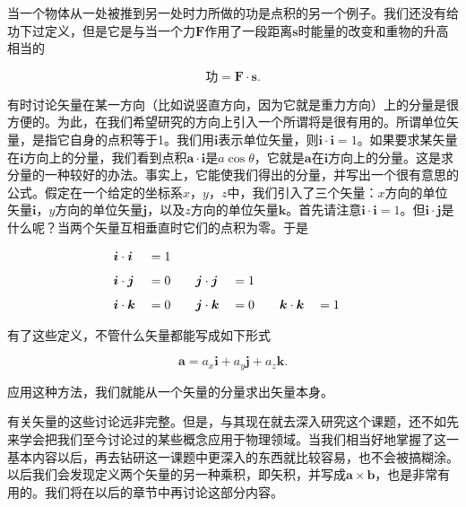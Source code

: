 \documentclass[12pt,oneside]{book}
\providecommand{\FLPvec}[1]{\boldsymbol{#1}}
\providecommand{\FLPF}[0]{\FLPvec{F}}
\providecommand{\FLPa}[0]{\FLPvec{a}}
\providecommand{\FLPb}[0]{\FLPvec{b}}
\providecommand{\FLPi}[0]{\FLPvec{i}}
\providecommand{\FLPj}[0]{\FLPvec{j}}
\providecommand{\FLPk}[0]{\FLPvec{k}}
\providecommand{\FLPs}[0]{\FLPvec{s}}
\begin{document}
当一个物体从一处被推到另一处时力所做的功是点积的另一个例子。我们还没有给功下过定义，但是它是与当一个力$ \FLPF $作用了一段距离$ \FLPs $时能量的改变和重物的升高相当的

\begin{equation}
\label{Eq:I:11:23}
\text{功}=\FLPF\cdot\FLPs.
\end{equation}


有时讨论矢量在某一方向（比如说竖直方向，因为它就是重力方向）上的分量是很方便的。为此，在我们希望研究的方向上引入一个所谓将是很有用的。所谓单位矢量，是指它自身的点积等于1。我们用$ \FLPi $表示单位矢量，则$ \FLPi\cdot\FLPi = 1 $。如果要求某矢量在$ \FLPi $方向上的分量，我们看到点积$ \FLPa\cdot\FLPi $是$ a\cos\theta $，它就是$ \FLPa $在$ \FLPi $方向上的分量。这是求分量的一种较好的办法。事实上，它能使我们得出的分量，并写出一个很有意思的公式。假定在一个给定的坐标系$ x $，$ y $，$ z $中，我们引入了三个矢量：$ x $方向的单位矢量$ \FLPi $，$ y $方向的单位矢量$ \FLPj $，以及$ z $方向的单位矢量$ \FLPk $。首先请注意$ \FLPi\cdot\FLPi = 1 $。但$ \FLPi\cdot\FLPj $是什么呢？当两个矢量互相垂直时它们的点积为零。于是

\begin{alignat}{6}
&\FLPi\cdot\FLPi&&=1\notag\\[1ex]
&\FLPi\cdot\FLPj&&=0&\quad
&\FLPj\cdot\FLPj&&=1\notag\\[1ex]
\label{Eq:I:11:24}
&\FLPi\cdot\FLPk&&=0&\quad
&\FLPj\cdot\FLPk&&=0&\quad
&\FLPk\cdot\FLPk&&=1
\end{alignat}

有了这些定义，不管什么矢量都能写成如下形式

\begin{equation}
\label{Eq:I:11:25}
\FLPa=a_x\FLPi+a_y\FLPj+a_z\FLPk.
\end{equation}

应用这种方法，我们就能从一个矢量的分量求出矢量本身。

有关矢量的这些讨论远非完整。但是，与其现在就去深入研究这个课题，还不如先来学会把我们至今讨论过的某些概念应用于物理领域。当我们相当好地掌握了这一基本内容以后，再去钻研这一课题中更深入的东西就比较容易，也不会被搞糊涂。以后我们会发现定义两个矢量的另一种乘积，即矢积，并写成$ \FLPa\times\FLPb $，也是非常有用的。我们将在以后的章节中再讨论这部分内容。
\end{document}
